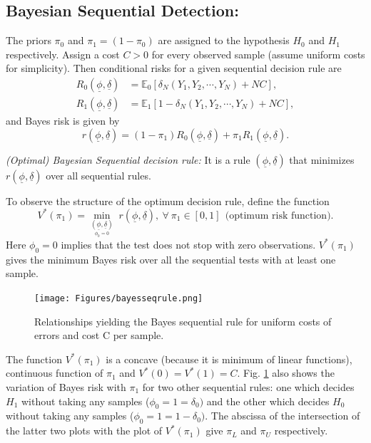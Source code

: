\documentclass[a4paper,english,12pt]{article}
\newcommand{\uphi}{\underline{\phi}}
\newcommand{\udel}{\underline{\delta}}
\begin{document}
\subsection{Bayesian Sequential Detection:}
The priors $\pi_0$ and $\pi_1=(1-\pi_0)$ are assigned to the hypothesis $H_0$ and $H_1$ respectively. Assign a
cost $C>0$ for every observed sample (assume uniform costs for simplicity). Then conditional risks for a given sequential decision rule are
\begin{align}
R_0(\uphi,\udel)&= \mathbb{E}_0[\delta_N(Y_1,Y_2,\cdots,Y_N)+NC],\\
R_1(\uphi,\udel)&= \mathbb{E}_1[1-\delta_N(Y_1,Y_2,\cdots,Y_N)+NC],
\end{align}
and Bayes risk is given by
\begin{equation}
r(\uphi,\udel)=(1-\pi_1)R_0(\uphi,\udel)+\pi_1R_1(\uphi,\udel).
\end{equation}
\begin{defn}
\emph{(Optimal) Bayesian Sequential decision rule:} It is a rule $(\uphi,\udel)$ that minimizes $r(\uphi,\udel)$ over all sequential rules.
\end{defn}
To observe the structure of the optimum decision rule, define the function 
\begin{equation}
V^*(\pi_1)=\underset{\underset{\phi_0=0}{(\uphi,\udel)}}\min\;r(\uphi,\udel),\  \forall\  \pi_1\in[0,1]\ \  \textrm{(optimum risk function)}.
\end{equation}
Here $\phi_0=0$ implies that the test does not stop with zero observations. $V^*(\pi_1)$ gives the minimum Bayes risk over all the sequential tests with at least one sample.
\begin{figure}
\centering
\texttt{[image: Figures/bayesseqrule.png]}
\caption{Relationships yielding the Bayes sequential rule for uniform costs of errors and cost C per sample.}
\label{fig:fig1}
\end{figure}
The function $V^*(\pi_1)$ is a concave (because it is minimum of linear functions), continuous function of $\pi_1$ and $V^*(0)=V^*(1)=C$. Fig. \ref{fig:fig1} also shows the variation of Bayes risk with $\pi_1$ for two other sequential rules: one which decides $H_1$ without taking any samples ($\phi_0=1=\delta_0)$ and the other which decides $H_0$ without taking any samples ($\phi_0=1=1-\delta_0)$. The abscissa of the intersection of the latter two plots with the plot of $V^*(\pi_1)$ give $\pi_L$ and $\pi_U$ respectively.
\end{document}
